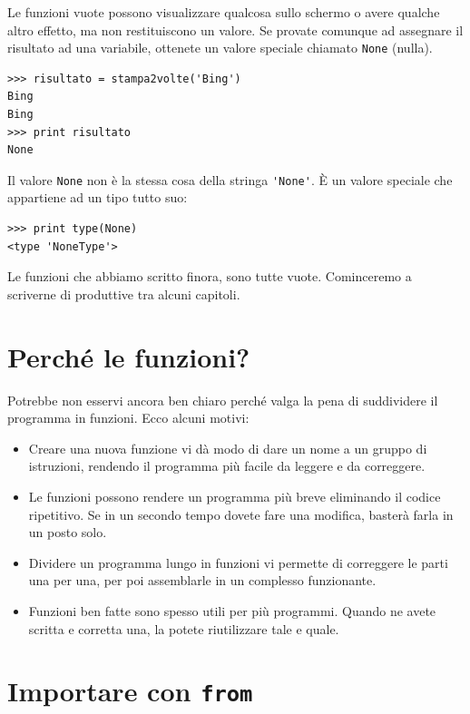 \documentclass[10pt]{book}
\begin{document}
Le funzioni vuote possono visualizzare qualcosa sullo schermo o avere qualche altro effetto, ma non restituiscono un valore. Se provate comunque ad assegnare il risultato ad una variabile, ottenete un valore speciale chiamato
{\tt None} (nulla).

\begin{verbatim}
>>> risultato = stampa2volte('Bing')
Bing
Bing
>>> print risultato
None
\end{verbatim}
%
Il valore {\tt None} non è la stessa cosa della stringa \verb"'None'". 
È un valore speciale che appartiene ad un tipo tutto suo:

\begin{verbatim}
>>> print type(None)
<type 'NoneType'>
\end{verbatim}
%
Le funzioni che abbiamo scritto finora, sono tutte vuote. Cominceremo a scriverne di produttive tra alcuni capitoli.


\section{Perché le funzioni?}

Potrebbe non esservi ancora ben chiaro perché valga la pena di suddividere il programma in funzioni. Ecco alcuni motivi:

\begin{itemize}

\item Creare una nuova funzione vi dà modo di dare un nome a un gruppo di istruzioni, rendendo il programma più facile da leggere e da correggere.

\item Le funzioni possono rendere un programma più breve eliminando il codice ripetitivo. Se in un secondo tempo dovete fare una modifica, basterà farla in un posto solo.

\item Dividere un programma lungo in funzioni vi permette di correggere le parti una per una, per poi assemblarle in un complesso funzionante.

\item Funzioni ben fatte sono spesso utili per più programmi. Quando ne avete scritta e corretta una, la potete riutilizzare tale e quale.

\end{itemize}


\section{Importare con {\tt from}}
\end{document}
